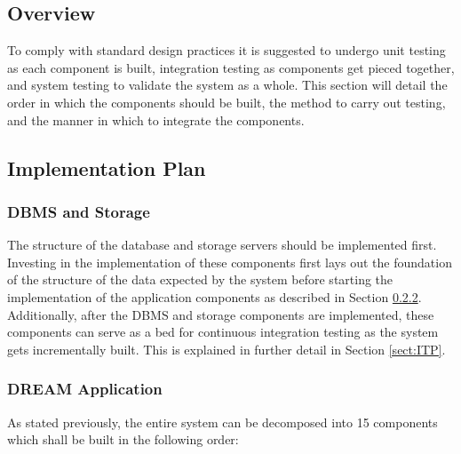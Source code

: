 \subsection{Overview}
\begin{flushleft}
To comply with standard design practices it is suggested to undergo unit testing as each component is built, integration testing as components get pieced together, and system testing to validate the system as a whole. This section will detail the order in which the components should be built, the method to carry out testing, and the manner in which to integrate the components.
\end{flushleft}

\subsection{Implementation Plan}
\subsubsection{DBMS and Storage}
\begin{flushleft}
The structure of the database and storage servers should be implemented first. Investing in the implementation of these components first lays out the foundation of the structure of the data expected by the system before starting the implementation of the application components as described in Section \ref{sect:AppIIT}. Additionally, after the DBMS and storage components are implemented, these components can serve as a bed for continuous integration testing as the system gets incrementally built. This is explained in further detail in Section \ref{sect:ITP}. 
\end{flushleft}

\subsubsection{DREAM Application}
\label{sect:AppIIT}
\begin{flushleft}
As stated previously, the entire system can be decomposed into 15 components which shall be built in the following order: 
\end{flushleft}

